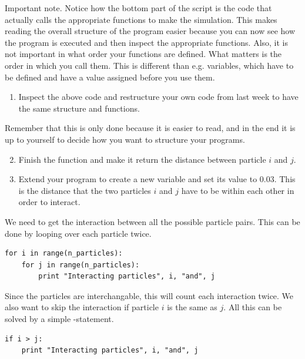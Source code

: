 \documentclass{article}
\begin{document}
\newpage
Important note.
Notice how the bottom part of the script is the code that actually calls the
appropriate functions to make the simulation.  This makes reading the overall
structure of the program easier because you can now see how the program is
executed and then inspect the appropriate functions.  Also, it is not important
in what order your functions are defined. What matters is the order in which you
call them. This is different than e.g. variables, which have to be defined and have a value assigned before you use them.

\begin{enumerate}
  \setcounter{enumi}{0}
  \item Inspect the above code and restructure your own code from last week to have the
    same structure and functions.
\end{enumerate}

Remember that this is only done because it is easier to read, and in
the end it is up to yourself to decide how you want to structure your
programs.

\begin{enumerate}
  \setcounter{enumi}{1}
  \item Finish the function  and make it return
    the distance  between particle $i$ and $j$.

\item Extend your program to create a new variable  and set its
    value to 0.03.
    This is the distance that the two particles $i$ and $j$ have to be within each other
    in order to interact.

\end{enumerate}

We need to get the interaction between all the possible particle pairs.
This can be done by looping over each particle twice.

\begin{lstlisting}
for i in range(n_particles):
    for j in range(n_particles):
        print "Interacting particles", i, "and", j
\end{lstlisting}

Since the particles are interchangable, this will count each interaction twice.
We also want to skip the interaction if particle $i$ is the same as $j$.
All this can be solved by a simple -statement.

\begin{lstlisting}
if i > j:
    print "Interacting particles", i, "and", j

\end{lstlisting}
\end{document}
